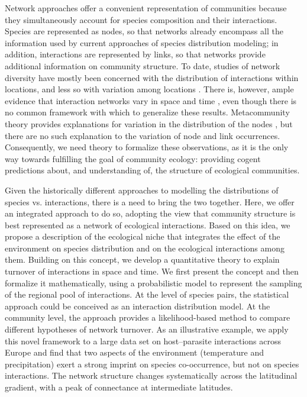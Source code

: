 \documentclass[12pt]{article}
\begin{document}
Network approaches offer a convenient representation of communities because
they simultaneously account for species composition and their interactions.
Species are represented as nodes, so that networks already encompass all the
information used by current approaches of species distribution modeling; in
addition, interactions are represented by links, so that networks provide
additional information on community structure. To date, studies of network
diversity have mostly been concerned with the distribution of interactions
within locations, and less so with variation among locations \citep{Dunne2006,
Bascompte2007, Ings2009, Kefi2012}. There is, however, ample evidence that
interaction networks vary in space and time \citep{Laliberte2010, Poisot2012,
Schleuning2012, Albouy2014, Poisot2016, Trojelsgaard2015}, even though there
is no common framework with which to generalize these results. Metacommunity
theory provides explanations for variation in the distribution of the nodes
\citep{Gravel2011c, Pillai2011,Cazelles2015}, but there are no such explanation
to the variation of node and link occurrences. Consequently, we need theory to
formalize these observations, as it is the only way towards fulfilling the
goal of community ecology: providing cogent predictions about, and
understanding of, the structure of ecological communities.

Given the historically different approaches to modelling the distributions of
species vs. interactions, there is a need to bring the two together. Here, we
offer an integrated approach to do so, adopting the view that community
structure is best represented as a network of ecological interactions. Based
on this idea, we propose a description of the ecological niche that
integrates the effect of the environment on species distribution and on the
ecological interactions among them. Building on this concept, we develop a
quantitative theory to explain turnover of interactions in space and time. We
first present the concept and then formalize it mathematically, using a
probabilistic model to represent the sampling of the regional pool of
interactions. At the level of species pairs, the statistical approach could be
conceived as an interaction distribution model. At the community level, the
approach provides a likelihood-based method to compare different hypotheses of
network turnover. As an illustrative example, we apply this novel framework to
a large data set on host–parasite interactions across Europe and find that two
aspects of the environment (temperature and precipitation) exert a strong
imprint on species co-occurrence, but not on species interactions. The network
structure changes systematically across the latitudinal gradient, with a peak
of connectance at intermediate latitudes.
\end{document}
